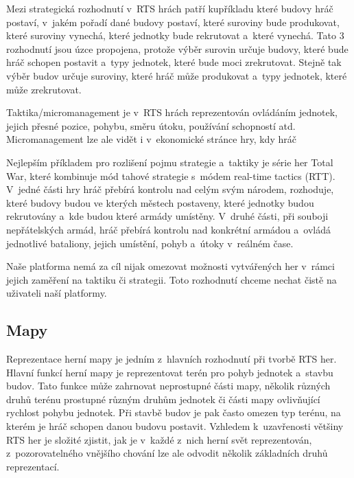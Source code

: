 Mezi strategická rozhodnutí v~RTS hrách patří kupříkladu které budovy hráč postaví, v~jakém pořadí dané budovy postaví, které suroviny bude produkovat, které suroviny vynechá, které jednotky bude rekrutovat a~které vynechá.  Tato 3 rozhodnutí jsou úzce propojena, protože výběr surovin určuje budovy, které bude hráč schopen postavit a~typy jednotek, které bude moci zrekrutovat. Stejně tak výběr budov určuje suroviny, které hráč může produkovat a~typy jednotek, které může zrekrutovat. 

Taktika/micromanagement je v~RTS hrách reprezentován ovládáním jednotek, jejich přesné pozice, pohybu, směru útoku, používání schopností atd. Micromanagement lze ale vidět i v~ekonomické stránce hry, kdy hráč 

Nejlepším příkladem pro rozlišení pojmu strategie a~taktiky je série her Total War\citep{site:totalwar}, které kombinuje mód tahové strategie s~módem real-time tactics (RTT). V~jedné části hry hráč přebírá kontrolu nad celým svým národem, rozhoduje, které budovy budou ve kterých městech postaveny, které jednotky budou rekrutovány a~kde budou které armády umístěny. V~druhé části, při souboji nepřátelských armád, hráč přebírá kontrolu nad konkrétní armádou a~ovládá jednotlivé bataliony, jejich umístění, pohyb a~útoky v~reálném čase.

Naše platforma nemá za cíl nijak omezovat možnosti vytvářených her v~rámci jejich zaměření na taktiku či strategii. Toto rozhodnutí chceme nechat čistě na uživateli naší platformy.

\subsection{Mapy}
\label{sec:mapy}
Reprezentace herní mapy je jedním z~hlavních rozhodnutí při tvorbě RTS her. Hlavní funkcí herní mapy je reprezentovat terén pro pohyb jednotek a~stavbu budov. 
Tato funkce může zahrnovat neprostupné části mapy, několik různých druhů terénu prostupné různým druhům jednotek či části mapy ovlivňující rychlost pohybu jednotek.
Při stavbě budov je pak často omezen typ terénu, na kterém je hráč schopen danou budovu postavit. 
Vzhledem k~uzavřenosti většiny RTS her je složité zjistit, jak je v~každé z~nich herní svět reprezentován, z~pozorovatelného vnějšího chování lze ale odvodit několik základních druhů reprezentací. 


